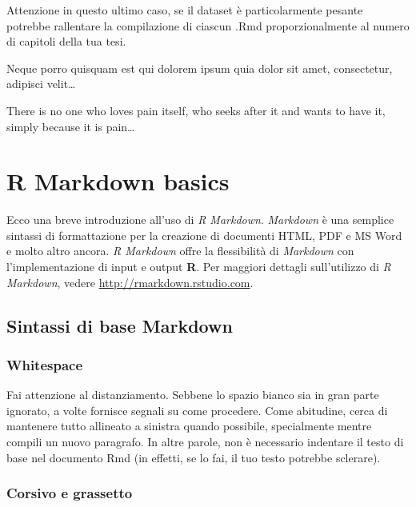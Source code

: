 \documentclass[a4paper, 11pt, nobind]{templates/ociamthesis}
\begin{document}
Attenzione in questo ultimo caso, se il dataset è particolarmente pesante potrebbe rallentare la compilazione di ciascun .Rmd proporzionalmente al numero di capitoli della tua tesi.

\begin{savequote}
Neque porro quisquam est qui dolorem ipsum quia dolor sit amet,
consectetur, adipisci velit\ldots{}

There is no one who loves pain itself, who seeks after it and wants to
have it, simply because it is pain\ldots{}
\end{savequote}



\hypertarget{rmd-basics}{%
\chapter{R Markdown basics}\label{rmd-basics}}

\minitoc 

\noindent Ecco una breve introduzione all'uso di \emph{R Markdown}.
\emph{Markdown} è una semplice sintassi di formattazione per la creazione di documenti HTML, PDF e MS Word e molto altro ancora.
\emph{R Markdown} offre la flessibilità di \emph{Markdown} con l'implementazione di input e output \textbf{R}. Per maggiori dettagli sull'utilizzo di \emph{R Markdown}, vedere \url{http://rmarkdown.rstudio.com}.

\hypertarget{sintassi-di-base-markdown}{%
\section{Sintassi di base Markdown}\label{sintassi-di-base-markdown}}

\hypertarget{whitespace}{%
\subsection{Whitespace}\label{whitespace}}

Fai attenzione al distanziamento.
Sebbene lo spazio bianco sia in gran parte ignorato, a volte fornisce segnali su come procedere.
Come abitudine, cerca di mantenere tutto allineato a sinistra quando possibile, specialmente mentre compili un nuovo paragrafo.
In altre parole, non è necessario indentare il testo di base nel documento Rmd (in effetti, se lo fai, il tuo testo potrebbe sclerare).

\hypertarget{corsivo-e-grassetto}{%
\subsection{Corsivo e grassetto}\label{corsivo-e-grassetto}}
\end{document}
